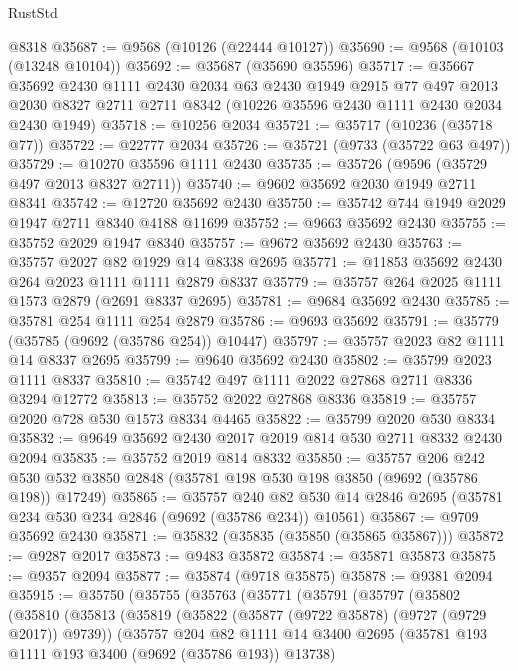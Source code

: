 \begin{lexlean}{RustStd}
\begin{coremodule}
    @8318
@35687 := @9568 (@10126 (@22444 @10127))
@35690 := @9568 (@10103 (@13248 @10104))
@35692 := @35687 (@35690 @35596)
@35717 := @35667
    @35692
    @2430
    @1111
    @2430
    @2034
    @63
    @2430
    @1949
    @2915
    @77
    @497
    @2013
    @2030
    @8327
    @2711
    @2711
    @8342
    (@10226 @35596 @2430 @1111 @2430 @2034 @2430 @1949)
@35718 := @10256 @2034
@35721 := @35717 (@10236 (@35718 @77))
@35722 := @22777 @2034
@35726 := @35721 (@9733 (@35722 @63 @497))
@35729 := @10270 @35596 @1111 @2430
@35735 := @35726 (@9596 (@35729 @497 @2013 @8327 @2711))
@35740 := @9602 @35692 @2030 @1949 @2711 @8341
@35742 := @12720 @35692 @2430
@35750 := @35742 @744 @1949 @2029 @1947 @2711 @8340 @4188 @11699
@35752 := @9663 @35692 @2430
@35755 := @35752 @2029 @1947 @8340
@35757 := @9672 @35692 @2430
@35763 := @35757 @2027 @82 @1929 @14 @8338 @2695
@35771 := @11853 @35692 @2430 @264 @2023 @1111 @1111 @2879 @8337
@35779 := @35757 @264 @2025 @1111 @1573 @2879 (@2691 @8337 @2695)
@35781 := @9684 @35692 @2430
@35785 := @35781 @254 @1111 @254 @2879
@35786 := @9693 @35692
@35791 := @35779 (@35785 (@9692 (@35786 @254)) @10447)
@35797 := @35757 @2023 @82 @1111 @14 @8337 @2695
@35799 := @9640 @35692 @2430
@35802 := @35799 @2023 @1111 @8337
@35810 := @35742 @497 @1111 @2022 @27868 @2711 @8336 @3294 @12772
@35813 := @35752 @2022 @27868 @8336
@35819 := @35757 @2020 @728 @530 @1573 @8334 @4465
@35822 := @35799 @2020 @530 @8334
@35832 := @9649 @35692 @2430 @2017 @2019 @814 @530 @2711 @8332 @2430 @2094
@35835 := @35752 @2019 @814 @8332
@35850 := @35757
    @206
    @242
    @530
    @532
    @3850
    @2848
    (@35781 @198 @530 @198 @3850 (@9692 (@35786 @198)) @17249)
@35865 := @35757
    @240
    @82
    @530
    @14
    @2846
    @2695
    (@35781 @234 @530 @234 @2846 (@9692 (@35786 @234)) @10561)
@35867 := @9709 @35692 @2430
@35871 := @35832 (@35835 (@35850 (@35865 @35867)))
@35872 := @9287 @2017
@35873 := @9483 @35872
@35874 := @35871 @35873
@35875 := @9357 @2094
@35877 := @35874 (@9718 @35875)
@35878 := @9381 @2094
@35915 := @35750
    (@35755
      (@35763
        (@35771
          (@35791
            (@35797
              (@35802
                (@35810
                  (@35813
                    (@35819
                      (@35822 (@35877 (@9722 @35878) (@9727 (@9729 @2017)) @9739))
                      (@35757
                        @204
                        @82
                        @1111
                        @14
                        @3400
                        @2695
                        (@35781 @193 @1111 @193 @3400 (@9692 (@35786 @193)) @13738)

\end{coremodule}
\end{lexlean}
